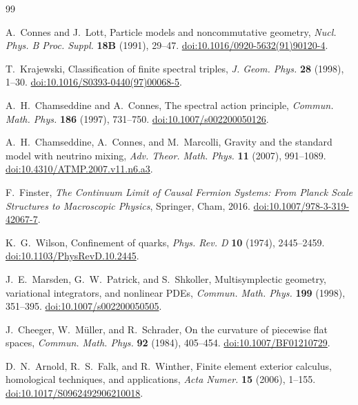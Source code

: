 \documentclass[11pt]{article}
\numberwithin{equation}{section}
\theoremstyle{definition}
\theoremstyle{remark}
\begin{document}
\clearpage
\begin{thebibliography}{99}
\small
\setlength{\itemsep}{2pt}

A.~Connes and J.~Lott,
Particle models and noncommutative geometry,
\emph{Nucl. Phys. B Proc. Suppl.} \textbf{18B} (1991), 29--47.
\href{https://doi.org/10.1016/0920-5632(91)90120-4}{doi:10.1016/0920-5632(91)90120-4}.

T.~Krajewski,
Classification of finite spectral triples,
\emph{J. Geom. Phys.} \textbf{28} (1998), 1--30.
\href{https://doi.org/10.1016/S0393-0440(97)00068-5}{doi:10.1016/S0393-0440(97)00068-5}.

A.~H.~Chamseddine and A.~Connes,
The spectral action principle,
\emph{Commun. Math. Phys.} \textbf{186} (1997), 731--750.
\href{https://doi.org/10.1007/s002200050126}{doi:10.1007/s002200050126}.

A.~H.~Chamseddine, A.~Connes, and M.~Marcolli,
Gravity and the standard model with neutrino mixing,
\emph{Adv. Theor. Math. Phys.} \textbf{11} (2007), 991--1089.
\href{https://doi.org/10.4310/ATMP.2007.v11.n6.a3}{doi:10.4310/ATMP.2007.v11.n6.a3}.

F.~Finster,
\emph{The Continuum Limit of Causal Fermion Systems:
From Planck Scale Structures to Macroscopic Physics},
Springer, Cham, 2016.
\href{https://doi.org/10.1007/978-3-319-42067-7}{doi:10.1007/978-3-319-42067-7}.

K.~G.~Wilson,
Confinement of quarks,
\emph{Phys. Rev. D} \textbf{10} (1974), 2445--2459.
\href{https://doi.org/10.1103/PhysRevD.10.2445}{doi:10.1103/PhysRevD.10.2445}.

J.~E.~Marsden, G.~W.~Patrick, and S.~Shkoller,
Multisymplectic geometry, variational integrators, and nonlinear PDEs,
\emph{Commun. Math. Phys.} \textbf{199} (1998), 351--395.
\href{https://doi.org/10.1007/s002200050505}{doi:10.1007/s002200050505}.

J.~Cheeger, W.~M\"uller, and R.~Schrader,
On the curvature of piecewise flat spaces,
\emph{Commun. Math. Phys.} \textbf{92} (1984), 405--454.
\href{https://doi.org/10.1007/BF01210729}{doi:10.1007/BF01210729}.

D.~N.~Arnold, R.~S.~Falk, and R.~Winther,
Finite element exterior calculus, homological techniques, and applications,
\emph{Acta Numer.} \textbf{15} (2006), 1--155.
\href{https://doi.org/10.1017/S0962492906210018}{doi:10.1017/S0962492906210018}.


\end{thebibliography}
\end{document}
